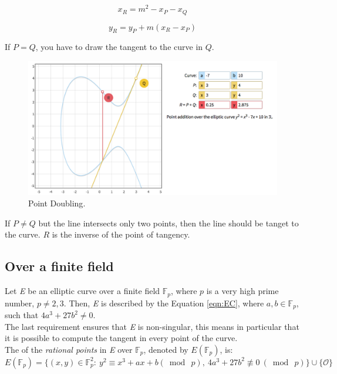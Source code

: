 \begin{equation}
x_{R}=m^{2}-x_{P}-x_{Q}
\end{equation}

\begin{equation}
y_{R}=y_{P}+m(x_{R}-x_{P})
\end{equation}

If $P=Q$, you have to draw the tangent to the curve in $Q$.

\begin{figure}[H]
	\centering
	\includegraphics[width=.7\textwidth]{doubling.png}
	\caption{Point Doubling\cite{graf}.}
	\label{img:ec prod}
\end{figure}

If $P\neq Q$ but the line intersects only two points, then the line should be tanget to the curve. $R$ is the inverse of the point of tangency.

\subsection{Over a finite field}
Let \textit{E} be an elliptic curve over a finite field $\mathbb{F}_{p}$, where $p$ is a very high prime number, $p\neq 2,3$. Then, \textit{E} is described by the Equation \eqref{eqn:EC}, where $a,b \in \mathbb{F}_{p}$, such that $4a^{3}+27b^{2}\neq 0$.\\
The last requirement ensures that \textit{E} is non-singular, this means in particular that it is possible to compute the tangent in every point of the curve.\\
The of the \textit{rational points} in \textit{E} over $\mathbb{F}_{p}$, denoted by $E(\mathbb{F}_{p})$, is:
\begin{equation}
	E(\mathbb{F}_{p})=\{(x,y)\in \mathbb{F}_{p}^{2} :\ y^{2}\equiv x^{3}+ax+b (\bmod\ p),\ 4a^{3}+27b^{2}\not\equiv 0\ (\bmod\ p) \}\cup \{\mathcal{O}\}
\end{equation}

